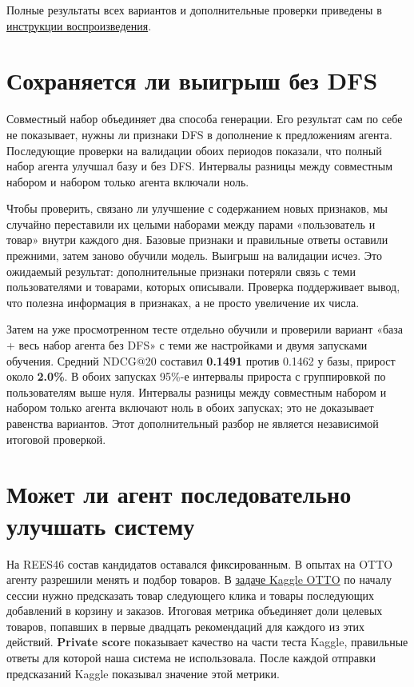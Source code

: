 \documentclass[11pt,a4paper]{article}
\begin{document}
Полные результаты всех вариантов и дополнительные проверки приведены в \href{https://github.com/suprend/tlab-recsys-2026-task1/blob/main/docs/task1-reproduce.md}{инструкции воспроизведения}.

\section{Сохраняется ли выигрыш без DFS}
Совместный набор объединяет два способа генерации. Его результат сам по себе не показывает, нужны ли признаки DFS в дополнение к предложениям агента. Последующие проверки на валидации обоих периодов показали, что полный набор агента улучшал базу и без DFS. Интервалы разницы между совместным набором и набором только агента включали ноль.

Чтобы проверить, связано ли улучшение с содержанием новых признаков, мы случайно переставили их целыми наборами между парами «пользователь и товар» внутри каждого дня. Базовые признаки и правильные ответы оставили прежними, затем заново обучили модель. Выигрыш на валидации исчез. Это ожидаемый результат: дополнительные признаки потеряли связь с теми пользователями и товарами, которых описывали. Проверка поддерживает вывод, что полезна информация в признаках, а не просто увеличение их числа.

Затем на уже просмотренном тесте отдельно обучили и проверили вариант «база + весь набор агента без DFS» с теми же настройками и двумя запусками обучения. Средний NDCG@20 составил \textbf{0.1491} против 0.1462 у базы, прирост около \textbf{2.0\%}. В обоих запусках 95\%-е интервалы прироста с группировкой по пользователям выше нуля. Интервалы разницы между совместным набором и набором только агента включают ноль в обоих запусках; это не доказывает равенства вариантов. Этот дополнительный разбор не является независимой итоговой проверкой.

\section{Может ли агент последовательно улучшать систему}
На REES46 состав кандидатов оставался фиксированным. В опытах на OTTO агенту разрешили менять и подбор товаров. В \href{https://github.com/otto-de/recsys-dataset/blob/main/KAGGLE.md}{задаче Kaggle OTTO} по началу сессии нужно предсказать товар следующего клика и товары последующих добавлений в корзину и заказов. Итоговая метрика объединяет доли целевых товаров, попавших в первые двадцать рекомендаций для каждого из этих действий. \textbf{Private score} показывает качество на части теста Kaggle, правильные ответы для которой наша система не использовала. После каждой отправки предсказаний Kaggle показывал значение этой метрики.
\end{document}
